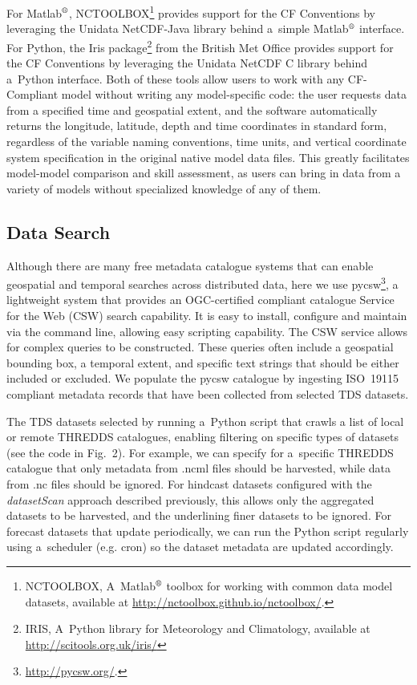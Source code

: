 \documentclass[osd, online, hvmath]{copernicus}
\begin{document}
For Matlab$^{\text{\textregistered}}$, NCTOOLBOX\footnote{NCTOOLBOX,
  A~Matlab$^{\text{\textregistered}}$ toolbox for working with common
  data model datasets, available at
  \url{http://nctoolbox.github.io/nctoolbox/}.} provides support for
the CF Conventions by leveraging the Unidata NetCDF-Java library
behind a~simple Matlab$^{\text{\textregistered}}$ interface. For
Python, the Iris package\footnote{IRIS, A~Python library for
  Meteorology and Climatology, available at
  \url{http://scitools.org.uk/iris/}} from the British Met Office
provides support for the CF Conventions by leveraging the Unidata
NetCDF C library behind a~Python interface.  Both of these tools allow users to work with any CF-Compliant model without writing any model-specific code:  the user requests data from a 
specified time and geospatial extent, and the software automatically returns the longitude, latitude, depth and time coordinates in standard form, regardless of the variable naming conventions, time units, and vertical coordinate system specification in the original native model data files.  This greatly facilitates model-model comparison and skill assessment, as users can bring in data from a variety of models without specialized knowledge of any of them. 

\subsection{Data Search}

Although there are many free metadata catalogue systems that can enable geospatial and temporal searches across distributed data, here we use pycsw\footnote{\url{http://pycsw.org/}.}, a lightweight system that provides an OGC-certified compliant catalogue Service for the Web (CSW) search capability.  It is easy to install, configure and maintain via the command line, allowing easy scripting capability.  The CSW service allows for complex queries to be constructed.  These queries often include a geospatial bounding box, a temporal extent, and specific text strings that should be either included or excluded.  We populate the pycsw catalogue by ingesting ISO~19115 compliant metadata records that have been collected from selected TDS datasets. 

The TDS datasets selected by running a~Python script that
crawls a list of local or remote THREDDS catalogues, enabling
filtering on specific types of datasets (see the code in Fig.~2). For
example, we can specify for a~specific THREDDS catalogue that only metadata
from .ncml files should be harvested, while data from .nc files should be
ignored. For hindcast datasets configured with the
\textit{datasetScan} approach described previously, this allows only
the aggregated datasets to be harvested, and the underlining finer
datasets to be ignored. For forecast datasets that update
periodically, we can run the Python script regularly using a~scheduler
(e.g. cron) so the dataset metadata are updated accordingly.
\end{document}
